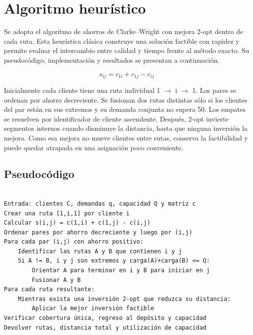 \documentclass[11pt,a4paper]{article}
\numberwithin{equation}{section}
\begin{document}
\Needspace{110pt}

\section{Algoritmo heurístico}

Se adopta el algoritmo de ahorros de Clarke--Wright con mejora 2-opt dentro de cada ruta. Esta heurística clásica construye una solución factible con rapidez y permite evaluar el intercambio entre calidad y tiempo frente al método exacto. Su pseudocódigo, implementación y resultados se presentan a continuación.



\begin{equation}\label{eq:ahorro}
s_{ij}=c_{1i}+c_{1j}-c_{ij}
\end{equation}


Inicialmente cada cliente tiene una ruta individual 1 \(\to\) i \(\to\) 1. Los pares se ordenan por ahorro decreciente. Se fusionan dos rutas distintas sólo si los clientes del par están en sus extremos y su demanda conjunta no supera 50. Los empates se resuelven por identificador de cliente ascendente. Después, 2-opt invierte segmentos internos cuando disminuye la distancia, hasta que ninguna inversión la mejora. Como esa mejora no mueve clientes entre rutas, conserva la factibilidad y puede quedar atrapada en una asignación poco conveniente.


\Needspace{250pt}

\subsection{Pseudocódigo}

\begin{minipage}{\linewidth}

\begin{lstlisting}

Entrada: clientes C, demandas q, capacidad Q y matriz c
Crear una ruta [1,i,1] por cliente i
Calcular s(i,j) = c(1,i) + c(1,j) - c(i,j)
Ordenar pares por ahorro decreciente y luego por (i,j)
Para cada par (i,j) con ahorro positivo:
    Identificar las rutas A y B que contienen i y j
    Si A != B, i y j son extremos y carga(A)+carga(B) <= Q:
        Orientar A para terminar en i y B para iniciar en j
        Fusionar A y B
Para cada ruta resultante:
    Mientras exista una inversión 2-opt que reduzca su distancia:
        Aplicar la mejor inversión factible
Verificar cobertura única, regreso al depósito y capacidad
Devolver rutas, distancia total y utilización de capacidad

\end{lstlisting}

\end{minipage}
\end{document}
